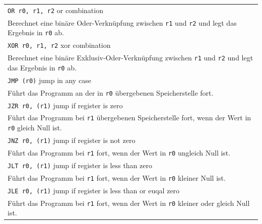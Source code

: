 {\begin{longtable}{|p{\textwidth}|}
        \hline
        \verb|OR r0, r1, r2|
        \hfill {\footnotesize or combination}
        \\
        Berechnet eine binäre Oder-Verknüpfung zwischen \texttt{r1} und \texttt{r2}
        und legt das Ergebnis in \texttt{r0} ab.
        \\

        \hline
        \verb|XOR r0, r1, r2|
        \hfill {\footnotesize xor combination}
        \\
        Berechnet eine binäre Exklusiv-Oder-Verknüpfung zwischen \texttt{r1} und
        \texttt{r2} und legt das Ergebnis in \texttt{r0} ab.
        \\

        \hline
        \hline

        \hline
        \verb|JMP (r0)|
        \hfill {\footnotesize jump in any case}
        \\
        Führt das Programm an der in \texttt{r0} übergebenen Speicherstelle fort.
        \\

        \hline
        \verb|JZR r0, (r1)|
        \hfill {\footnotesize jump if register is zero}
        \\
        Führt das Programm bei \texttt{r1} übergebenen Speicherstelle fort,
        wenn der Wert in \texttt{r0} gleich Null ist.
        \\

        \hline
        \verb|JNZ r0, (r1)|
        \hfill {\footnotesize jump if register is not zero}
        \\
        Führt das Programm bei \texttt{r1} fort, wenn der Wert in \texttt{r0}
        ungleich Null ist.
        \\

        \hline
        \verb|JLT r0, (r1)|
        \hfill {\footnotesize jump if register is less than zero}
        \\
        Führt das Programm bei \texttt{r1} fort, wenn der Wert in \texttt{r0}
        kleiner Null ist.
        \\

        \hline
        \verb|JLE r0, (r1)|
        \hfill {\footnotesize jump if register is less than or euqal zero}
        \\
        Führt das Programm bei \texttt{r1} fort, wenn der Wert in \texttt{r0}
        kleiner oder gleich Null ist.
        \\


\end{longtable}}

